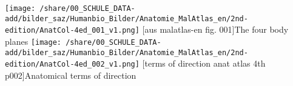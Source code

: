 \hspace{0.3cm}
\begin{minipage}{9cm}
	\texttt{[image: /share/00\_SCHULE\_DATA-add/bilder\_saz/Humanbio\_Bilder/Anatomie\_MalAtlas\_en/2nd-edition/AnatCol-4ed\_001\_v1.png]}
	[aus malatlas-en fig. 001]{The four body planes}
	\label{fig:BodyPlanesAnatAtl}
 		\centering
		{\texttt{[image: /share/00\_SCHULE\_DATA-add/bilder\_saz/Humanbio\_Bilder/Anatomie\_MalAtlas\_en/2nd-edition/AnatCol-4ed\_002\_v1.png]}}
		[terms of direction anat atlas 4th p002]{Anatomical terms of direction}  \label{fig:AnatDirections}
		\vspace{2pt}
	\end{minipage}
  


 \areaset[0cm]{18cm}{26cm}
